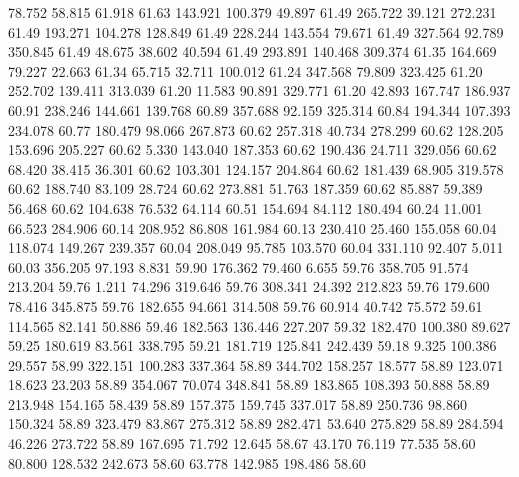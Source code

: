   78.752   58.815   61.918        61.63
 143.921  100.379   49.897        61.49
 265.722   39.121  272.231        61.49
 193.271  104.278  128.849        61.49
 228.244  143.554   79.671        61.49
 327.564   92.789  350.845        61.49
  48.675   38.602   40.594        61.49
 293.891  140.468  309.374        61.35
 164.669   79.227   22.663        61.34
  65.715   32.711  100.012        61.24
 347.568   79.809  323.425        61.20
 252.702  139.411  313.039        61.20
  11.583   90.891  329.771        61.20
  42.893  167.747  186.937        60.91
 238.246  144.661  139.768        60.89
 357.688   92.159  325.314        60.84
 194.344  107.393  234.078        60.77
 180.479   98.066  267.873        60.62
 257.318   40.734  278.299        60.62
 128.205  153.696  205.227        60.62
   5.330  143.040  187.353        60.62
 190.436   24.711  329.056        60.62
  68.420   38.415   36.301        60.62
 103.301  124.157  204.864        60.62
 181.439   68.905  319.578        60.62
 188.740   83.109   28.724        60.62
 273.881   51.763  187.359        60.62
  85.887   59.389   56.468        60.62
 104.638   76.532   64.114        60.51
 154.694   84.112  180.494        60.24
  11.001   66.523  284.906        60.14
 208.952   86.808  161.984        60.13
 230.410   25.460  155.058        60.04
 118.074  149.267  239.357        60.04
 208.049   95.785  103.570        60.04
 331.110   92.407    5.011        60.03
 356.205   97.193    8.831        59.90
 176.362   79.460    6.655        59.76
 358.705   91.574  213.204        59.76
   1.211   74.296  319.646        59.76
 308.341   24.392  212.823        59.76
 179.600   78.416  345.875        59.76
 182.655   94.661  314.508        59.76
  60.914   40.742   75.572        59.61
 114.565   82.141   50.886        59.46
 182.563  136.446  227.207        59.32
 182.470  100.380   89.627        59.25
 180.619   83.561  338.795        59.21
 181.719  125.841  242.439        59.18
   9.325  100.386   29.557        58.99
 322.151  100.283  337.364        58.89
 344.702  158.257   18.577        58.89
 123.071   18.623   23.203        58.89
 354.067   70.074  348.841        58.89
 183.865  108.393   50.888        58.89
 213.948  154.165   58.439        58.89
 157.375  159.745  337.017        58.89
 250.736   98.860  150.324        58.89
 323.479   83.867  275.312        58.89
 282.471   53.640  275.829        58.89
 284.594   46.226  273.722        58.89
 167.695   71.792   12.645        58.67
  43.170   76.119   77.535        58.60
  80.800  128.532  242.673        58.60
  63.778  142.985  198.486        58.60
